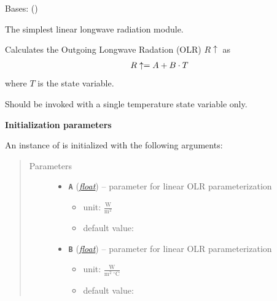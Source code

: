 \documentclass[a4paper,10pt,english]{sphinxmanual}
\begin{document}
\begin{fulllineitems}
\label{api/climlab.radiation:climlab.radiation.AplusBT.AplusBT}
Bases: {\hyperref[api/climlab.process:climlab.process.energy_budget.EnergyBudget]{\emph{}}} ()

The simplest linear longwave radiation module.

Calculates the Outgoing Longwave Radation (OLR) \(R\uparrow\) as
\begin{gather}
\begin{split}R\uparrow = A + B \cdot T\end{split}\notag
\end{gather}
where \(T\) is the state variable.

Should be invoked with a single temperature state variable only.

\textbf{Initialization parameters}

An instance of  is initialized with the following 
arguments:
\begin{quote}\begin{description}
\item[{Parameters}] \leavevmode\begin{itemize}
\item {} 
\textbf{\texttt{A}} (\href{http://docs.python.org/2.7/library/functions.html\#float}{\emph{float}}) -- 
parameter for linear OLR parameterization
\begin{itemize}
\item {} 
unit: \(\frac{\textrm{W}}
{\textrm{m}^2}\)

\item {} 
default value: 

\end{itemize}


\item {} 
\textbf{\texttt{B}} (\href{http://docs.python.org/2.7/library/functions.html\#float}{\emph{float}}) -- 
parameter for linear OLR parameterization
\begin{itemize}
\item {} 
unit: \(\frac{\textrm{W}}
{\textrm{m}^2 \ ^{\circ} \textrm{C}}\)

\item {} 
default value: 


\end{itemize}
\end{itemize}
\end{description}
\end{quote}
\end{fulllineitems}
\end{document}
